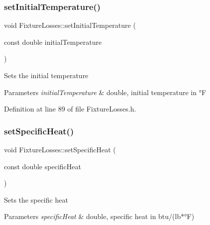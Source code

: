 \mbox{\label{class_fixture_losses_ad3f2a1013dc5da103f2bcfc1357a449b}} 
\subsubsection{\texorpdfstring{set\+Initial\+Temperature()}{setInitialTemperature()}\hspace{0.1cm}{\footnotesize\ttfamily [3/3]}}
{\footnotesize\ttfamily void Fixture\+Losses\+::set\+Initial\+Temperature (\begin{DoxyParamCaption}\item[{const double}]{initial\+Temperature }\end{DoxyParamCaption})\hspace{0.3cm}{\ttfamily [inline]}}

Sets the initial temperature 
\begin{DoxyParams}{Parameters}
{\em initial\+Temperature} & double, initial temperature in °F \\
\hline
\end{DoxyParams}


Definition at line 89 of file Fixture\+Losses.\+h.

\mbox{\label{class_fixture_losses_a946e4b6da1cca9f27e57f97688499ee1}} 
\subsubsection{\texorpdfstring{set\+Specific\+Heat()}{setSpecificHeat()}\hspace{0.1cm}{\footnotesize\ttfamily [1/3]}}
{\footnotesize\ttfamily void Fixture\+Losses\+::set\+Specific\+Heat (\begin{DoxyParamCaption}\item[{const double}]{specific\+Heat }\end{DoxyParamCaption})\hspace{0.3cm}{\ttfamily [inline]}}

Sets the specific heat 
\begin{DoxyParams}{Parameters}
{\em specific\+Heat} & double, specific heat in btu/(lb$\ast$°F) \\
\hline
\end{DoxyParams}


